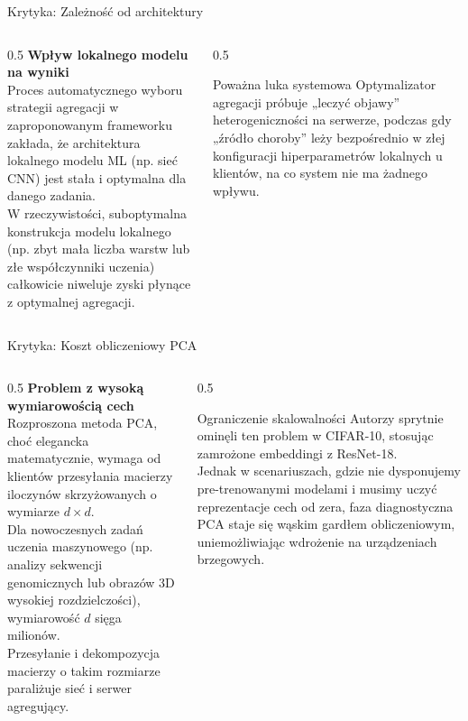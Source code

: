 \documentclass[9pt,aspectratio=169]{beamer}
\begin{document}
\begin{frame}{Krytyka: Zależność od architektury}
\begin{columns}[T]
\begin{column}{0.5\textwidth}
\textbf{Wpływ lokalnego modelu na wyniki}\\[4pt]
Proces automatycznego wyboru strategii agregacji w zaproponowanym frameworku zakłada, że architektura lokalnego modelu ML (np. sieć CNN) jest stała i optymalna dla danego zadania.\\[6pt]
W rzeczywistości, suboptymalna konstrukcja modelu lokalnego (np. zbyt mała liczba warstw lub złe współczynniki uczenia) całkowicie niweluje zyski płynące z optymalnej agregacji.
\end{column}
\begin{column}{0.5\textwidth}
\begin{infoboxorange}{Poważna luka systemowa}
Optymalizator agregacji próbuje „leczyć objawy” heterogeniczności na serwerze, podczas gdy „źródło choroby” leży bezpośrednio w złej konfiguracji hiperparametrów lokalnych u klientów, na co system nie ma żadnego wpływu.
\end{infoboxorange}
\end{column}
\end{columns}
\end{frame}

\begin{frame}{Krytyka: Koszt obliczeniowy PCA}
\begin{columns}[T]
\begin{column}{0.5\textwidth}
\textbf{Problem z wysoką wymiarowością cech}\\[4pt]
Rozproszona metoda PCA, choć elegancka matematycznie, wymaga od klientów przesyłania macierzy iloczynów skrzyżowanych o wymiarze $d\times d$.\\[6pt]
Dla nowoczesnych zadań uczenia maszynowego (np. analizy sekwencji genomicznych lub obrazów 3D wysokiej rozdzielczości), wymiarowość $d$ sięga milionów.\\[6pt]
Przesyłanie i dekompozycja macierzy o takim rozmiarze paraliżuje sieć i serwer agregujący.
\end{column}
\begin{column}{0.5\textwidth}
\begin{infoboxorange}{Ograniczenie skalowalności}
Autorzy sprytnie ominęli ten problem w CIFAR-10, stosując zamrożone embeddingi z ResNet-18.\\[6pt]
Jednak w scenariuszach, gdzie nie dysponujemy pre-trenowanymi modelami i musimy uczyć reprezentacje cech od zera, faza diagnostyczna PCA staje się wąskim gardłem obliczeniowym, uniemożliwiając wdrożenie na urządzeniach brzegowych.
\end{infoboxorange}
\end{column}
\end{columns}
\end{frame}
\end{document}
